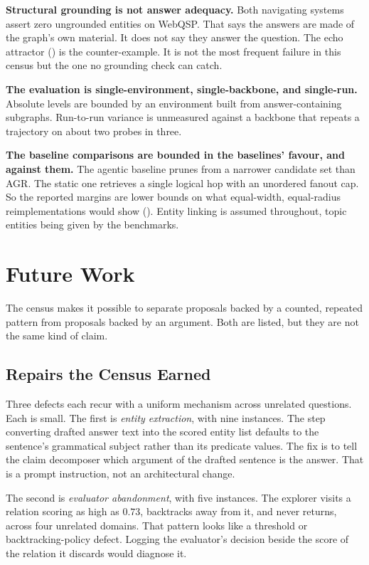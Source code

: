 \textbf{Structural grounding is not answer adequacy.} Both navigating systems
assert zero ungrounded entities on WebQSP. That says the answers are made of the
graph's own material. It does not say they answer the question. The echo
attractor () is the counter-example. It is not the most frequent
failure in this census but the one no grounding check can catch.

\textbf{The evaluation is single-environment, single-backbone, and single-run.}
Absolute levels are bounded by an environment built from answer-containing
subgraphs. Run-to-run variance is unmeasured against a backbone that repeats a
trajectory on about two probes in three.

\textbf{The baseline comparisons are bounded in the baselines' favour, and
against them.} The agentic baseline prunes from a narrower candidate set than
AGR. The static one retrieves a single logical hop with an unordered fanout cap.
So the reported margins are lower bounds on what equal-width, equal-radius
reimplementations would show (). Entity linking is
assumed throughout, topic entities being given by the benchmarks.

\section{Future Work}\label{sec:future}

The census makes it possible to separate proposals backed by a counted, repeated
pattern from proposals backed by an argument. Both are listed, but they are not
the same kind of claim.

\subsection{Repairs the Census Earned}

Three defects each recur with a uniform mechanism across unrelated questions.
Each is small. The first is \emph{entity extraction}, with nine instances. The
step converting drafted answer text into the scored entity list defaults to the
sentence's grammatical subject rather than its predicate values. The fix is to
tell the claim decomposer which argument of the drafted sentence is the answer.
That is a prompt instruction, not an architectural change.

The second is \emph{evaluator abandonment}, with five instances. The explorer
visits a relation scoring as high as $0.73$, backtracks away from it, and never
returns, across four unrelated domains. That pattern looks like a threshold or
backtracking-policy defect. Logging the evaluator's decision beside the score of
the relation it discards would diagnose it.

